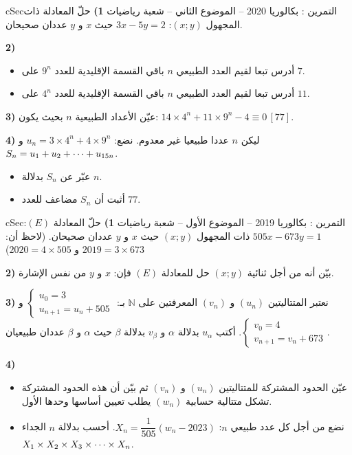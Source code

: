 \documentclass[12pt,a4paper]{article}
\newenvironment{BOX}[2]{\begin{otherlanguage}{english}\begin{arbox}{#1}{#2}}{\end{arbox}\end{otherlanguage}}
\newcounter{exo}
\newenvironment{tamrin}[1]{\stepcounter{exo}\begin{BOX}{cSec}{التمرين \theexo: #1}}{\end{BOX}}
\renewcommand{\cdots}{\mathinner{\cdotp\cdotp\cdotp}}
\newcommand{\N}{\mathbb{N}}
\newenvironment{sq}{\begin{itemize}[leftmargin=2.4em,itemsep=3pt]}{\end{itemize}}
\newcommand{\qa}{\item[(أ)]}\newcommand{\qb}{\item[(ب)]}\newcommand{\qc}{\item[(جـ)]}\newcommand{\qd}{\item[(د)]}\newcommand{\qe}{\item[(هـ)]}
\begin{document}
\begin{tamrin}{بكالوريا 2020 -- الموضوع الثاني -- شعبة رياضيات}
\textbf{1)} حلّ المعادلة ذات المجهول $(x;y)$: $3x-5y=2$ حيث $x$ و $y$ عددان صحيحان.

\textbf{2)}
\begin{sq}
\qa أدرس تبعا لقيم العدد الطبيعي $n$ باقي القسمة الإقليدية للعدد $9^n$ على $7$.
\qb أدرس تبعا لقيم العدد الطبيعي $n$ باقي القسمة الإقليدية للعدد $4^n$ على $11$.
\end{sq}
\textbf{3)} عيّن الأعداد الطبيعية $n$ بحيث يكون: $14\times4^n+11\times9^n-4\equiv0\,[77]$.

\textbf{4)} ليكن $n$ عددا طبيعيا غير معدوم. نضع: $u_n=3\times4^n+4\times9^n$ و $S_n=u_1+u_2+\cdots+u_{15n}$.
\begin{sq}
\qa عبّر عن $S_n$ بدلالة $n$.
\qb أثبت أن $S_n$ مضاعف للعدد $77$.
\end{sq}
\end{tamrin}

\begin{tamrin}{بكالوريا 2019 -- الموضوع الأول -- شعبة رياضيات}
\textbf{1)} حلّ المعادلة $(E)$:\quad $505x-673y=1$ ذات المجهول $(x;y)$ حيث $x$ و $y$ عددان صحيحان.
(لاحظ أن: $2019=3\times673$ و $2020=4\times505$)

\textbf{2)} بيّن أنه من أجل ثنائية $(x;y)$ حل للمعادلة $(E)$ فإن: $x$ و $y$ من نفس الإشارة.

\textbf{3)} نعتبر المتتاليتين $(u_n)$ و $(v_n)$ المعرفتين على $\N$ بـ:
$\begin{cases}u_0=3\\u_{n+1}=u_n+505\end{cases}$ و $\begin{cases}v_0=4\\v_{n+1}=v_n+673\end{cases}$.
أكتب $u_\alpha$ بدلالة $\alpha$ و $v_\beta$ بدلالة $\beta$ حيث $\alpha$ و $\beta$ عددان طبيعيان.

\textbf{4)}
\begin{sq}
\qa عيّن الحدود المشتركة للمتتاليتين $(u_n)$ و $(v_n)$ ثم بيّن أن هذه الحدود المشتركة تشكل متتالية حسابية $(w_n)$ يطلب تعيين أساسها وحدها الأول.
\qb نضع من أجل كل عدد طبيعي $n$: $X_n=\dfrac{1}{505}\left(w_n-2023\right)$.
أحسب بدلالة $n$ الجداء $X_1\times X_2\times X_3\times\cdots\times X_n$.
\end{sq}
\end{tamrin}
\end{document}
